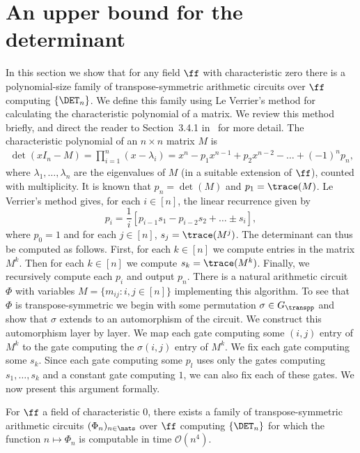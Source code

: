 \documentclass{toc}
\begin{document}
\section{An upper bound for the determinant}  %
\label{sec:determinant}
In this section we show that for any field $\ff$ with characteristic zero there
is a polynomial-size family of transpose-symmetric arithmetic circuits over $\ff$
computing $\{\DET_n\}$. We define this family using Le Verrier's method for
calculating the characteristic polynomial of a matrix. We review this method
briefly, and direct the reader to Section~3.4.1 in~\cite{Holm10} for more
detail.
The characteristic polynomial of an $n \times n$ matrix $M$ is
\begin{align*}
  \det(x I_n - M) = \prod^n_{i = 1} (x - \lambda_i) =
   x^n - p_1x^{n-1} + p_2 x^{n -2} - \ldots + (-1)^{n}p_n,
\end{align*}
where $\lambda_1, \ldots , \lambda_n$ are the eigenvalues of $M$ (in a suitable extension of $\ff$), counted with multiplicity.
%
%
%
It is known that $p_n = \det (M)$ and $p_1 = \trace(M)$. Le
Verrier's method gives, for each $i \in [n]$, the linear recurrence given by
$$p_i = \frac{1}{i} [p_{i -1} s_1 - p_{i -2} s_2 + \ldots \pm s_i],$$
where $p_0 = 1$ and for each $j \in [n]$, $s_j = \trace(M^j)$.
The determinant can thus be computed as follows. First, for each $k \in [n]$ we
compute entries in the matrix $M^k$. Then for each $k \in [n]$ we compute $s_k =
\trace(M^k)$. Finally, we recursively compute each $p_i$ and output $p_n$. There
is a natural arithmetic circuit $\Phi$ with variables $M = \{m_{ij} : i, j \in
[n]\}$ implementing this algorithm.
To see that $\Phi$ is transpose-symmetric we begin with some permutation $\sigma
\in G_{\transpp}$ and show that $\sigma$ extends to an automorphism of the
circuit. We construct this automorphism layer by layer. We map each gate
computing some $(i, j)$ entry of $M^k$ to the gate computing the $\sigma (i, j)$
entry of $M^k$. We fix each gate computing some $s_k$. Since each gate computing
some $p_l$ uses only the gates computing $s_1, \ldots, s_k$ and a constant gate
computing $1$, we can also fix each of these gates. We now present this argument
formally.
\begin{theorem}
  For $\ff$ %
  a field of characteristic $0$, there exists a family of transpose-symmetric
  arithmetic circuits $(\Phi_n)_{n \in \nats}$ over $\ff$ computing
  $\{\DET_n\}$ for which the function $n \mapsto \Phi_n$ is computable in time
  $\mathcal{O}(n^4)$.
  \label{thm:det-upper-bound}
\end{theorem}
\end{document}
